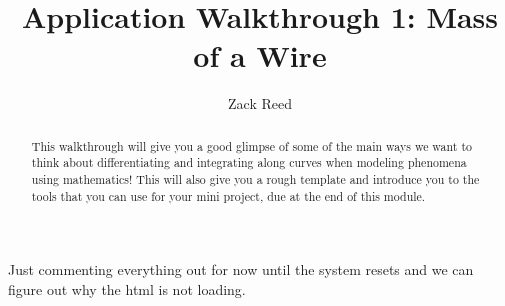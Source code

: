 \documentclass{ximera}
\title{Application Walkthrough 1: Mass of a Wire}
\author{Zack Reed}
\begin{document}
\begin{abstract}
This walkthrough will give you a good glimpse of some of the main ways we want to think about differentiating and integrating along curves when modeling phenomena using mathematics! This will also give you a rough template and introduce you to the tools that you can use for your mini project, due at the end of this module.
\end{abstract}
\maketitle

Just commenting everything out for now until the system resets and we can figure out why the html is not loading.







\end{document}
